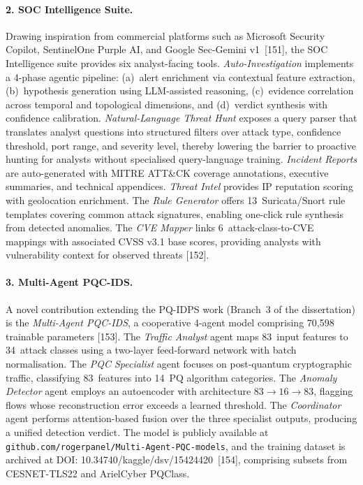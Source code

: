 \documentclass[12pt,a4paper]{article}
\begin{document}
\paragraph{2. SOC Intelligence Suite.}
Drawing inspiration from commercial platforms such as Microsoft
Security Copilot, SentinelOne Purple AI, and Google Sec-Gemini
v1~[151], the SOC Intelligence suite provides six analyst-facing
tools.  \emph{Auto-Investigation} implements a 4-phase agentic
pipeline: (a)~alert enrichment via contextual feature extraction,
(b)~hypothesis generation using LLM-assisted reasoning,
(c)~evidence correlation across temporal and topological dimensions,
and (d)~verdict synthesis with confidence calibration.
\emph{Natural-Language Threat Hunt} exposes a query parser that
translates analyst questions into structured filters over attack type,
confidence threshold, port range, and severity level, thereby
lowering the barrier to proactive hunting for analysts without
specialised query-language training.  \emph{Incident Reports} are
auto-generated with MITRE ATT\&CK coverage annotations, executive
summaries, and technical appendices.  \emph{Threat Intel} provides IP
reputation scoring with geolocation enrichment.  The \emph{Rule
Generator} offers 13~Suricata/Snort rule templates covering common
attack signatures, enabling one-click rule synthesis from detected
anomalies.  The \emph{CVE Mapper} links 6~attack-class-to-CVE
mappings with associated CVSS v3.1 base scores, providing analysts
with vulnerability context for observed threats [152].

\paragraph{3. Multi-Agent PQC-IDS.}
A novel contribution extending the PQ-IDPS work (Branch~3 of the
dissertation) is the \emph{Multi-Agent PQC-IDS}, a cooperative
4-agent model comprising 70{,}598 trainable parameters [153].  The
\emph{Traffic Analyst} agent maps 83~input features to 34~attack
classes using a two-layer feed-forward network with batch
normalisation.  The \emph{PQC Specialist} agent focuses on
post-quantum cryptographic traffic, classifying 83~features into
14~PQ algorithm categories.  The \emph{Anomaly Detector} agent
employs an autoencoder with architecture $83 \to 16 \to 83$,
flagging flows whose reconstruction error exceeds a learned
threshold.  The \emph{Coordinator} agent performs attention-based
fusion over the three specialist outputs, producing a unified
detection verdict.  The model is publicly available at
\texttt{github.com/rogerpanel/Multi-Agent-PQC-models}, and the
training dataset is archived at DOI:
10.34740/kaggle/dsv/15424420~[154], comprising subsets from
CESNET-TLS22 and ArielCyber PQClass.
\end{document}
